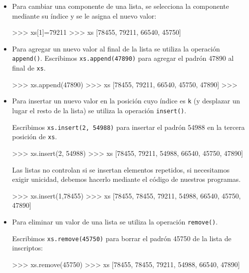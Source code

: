 \begin{itemize}

\item Para cambiar una componente de una lista, se selecciona la componente
mediante su índice y se le asigna el nuevo valor:

\begin{codigo-python-sn}
>>> xs[1]=79211
>>> xs
[78455, 79211, 66540, 45750]
\end{codigo-python-sn}

\item Para agregar un nuevo valor al final de la lista se utiliza la
operación \lstinline+append()+.  Escribimos \lstinline+xs.append(47890)+ para
agregar el padrón 47890 al final de \lstinline+xs+.

\begin{codigo-python-sn}
>>> xs.append(47890)
>>> xs
[78455, 79211, 66540, 45750, 47890]
>>>
\end{codigo-python-sn}

\item Para insertar un nuevo valor en la posición cuyo índice es
\lstinline+k+ (y desplazar un lugar el resto de la lista) se utiliza la
operación \lstinline+insert()+.

Escribimos \lstinline+xs.insert(2, 54988)+ para insertar el padrón 54988 en
la tercera posición de \lstinline+xs+.

\begin{codigo-python-sn}
>>> xs.insert(2, 54988)
>>> xs
[78455, 79211, 54988, 66540, 45750, 47890]
\end{codigo-python-sn}

\begin{observacion}
Las listas no controlan si se insertan elementos repetidos, si necesitamos
exigir unicidad, debemos hacerlo mediante el código de nuestros programas.
\end{observacion}

\begin{codigo-python-sn}
>>> xs.insert(1,78455)
>>> xs
[78455, 78455, 79211, 54988, 66540, 45750, 47890]
\end{codigo-python-sn}

\item Para eliminar un valor de una lista se utiliza la operación
\lstinline+remove()+.

Escribimos \lstinline+xs.remove(45750)+ para borrar el padrón 45750 de la
lista de inscriptos:

\begin{codigo-python-sn}
>>> xs.remove(45750)
>>> xs
[78455, 78455, 79211, 54988, 66540, 47890]
\end{codigo-python-sn}


\end{itemize}
